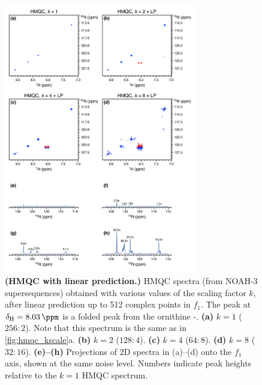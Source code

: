 \begin{figure}
    \centering
    \includegraphics[width=0.75\textwidth]{./figures/hmqc_kscale_lp.png}
    \caption{
        \textbf{(HMQC with linear prediction.)}
        \nitrogen{} HMQC spectra (from NOAH-3  supersequences) obtained with various values of the scaling factor $k$, after linear prediction up to 512 complex points in $f_1$.
        The peak at $\delta_{\ce{H}} = \SI{8.03}{\ppm}$ is a folded peak from the ornithine \textdelta-.
        \textbf{(a)} $k = 1$ ($256:2$). Note that this spectrum is the same as in \cref{fig:hmqc_kscale}a.
        \textbf{(b)} $k = 2$ ($128:4$).
        \textbf{(c)} $k = 4$ ($64:8$).
        \textbf{(d)} $k = 8$ ($32:16$).
        \textbf{(e)--(h)} Projections of 2D spectra in (a)--(d) onto the $f_1$ axis, shown at the same noise level.
        Numbers indicate peak heights relative to the $k = 1$ HMQC spectrum.
        \grami{}
    }
    \label{fig:hmqc_kscale_lp}
\end{figure}

